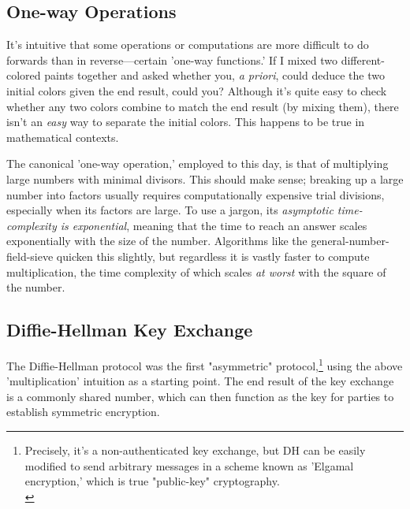 \documentclass[11pt, a4paper]{report}
\begin{document}

\subsection{One-way Operations}

It's intuitive that some operations or computations are more difficult to do forwards than in reverse—certain 'one-way functions.' If I mixed two different-colored paints together and asked whether you, \textit{a priori}, could deduce the two initial colors given the end result, could you? Although it's quite easy to check whether any two colors combine to match the end result (by mixing them), there isn't an \textit{easy} way to separate the initial colors. This happens to be true in mathematical contexts. 

The canonical 'one-way operation,' employed to this day, is that of multiplying large numbers with minimal divisors. This should make sense; breaking up a large number into factors usually requires computationally expensive trial divisions, especially when its factors are large. To use a jargon, its \textit{asymptotic time-complexity is exponential}, meaning that the time to reach an answer scales exponentially with the size of the number. Algorithms like the general-number-field-sieve quicken this slightly,\autocite[1482]{pomerance} but regardless it is vastly faster to compute multiplication, the time complexity of which scales \textit{at worst} with the square of the number.\autocite{bunimov}

\subsection{Diffie-Hellman Key Exchange}

The Diffie-Hellman protocol was the first "asymmetric" protocol,\footnote{Precisely, it's a non-authenticated key exchange, but DH can be easily modified to send arbitrary messages in a scheme known as 'Elgamal encryption,' which is true "public-key" cryptography.\\\autocite{elgamal}} using the above 'multiplication' intuition as a starting point. The end result of the key exchange is a commonly shared number, which can then function as the key for parties to establish symmetric encryption.
\end{document}
